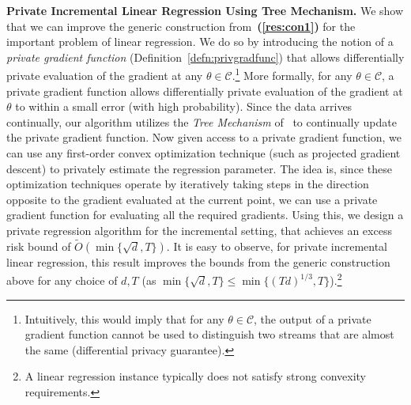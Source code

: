 \documentclass{article}
\theoremstyle{plain}
\newcommand{\resref}[1]{{\bf (\ref{res:#1})}}
\def \eps {\epsilon}
\def \CCC {\mathcal{C}}
\begin{document}
\begin{list}{{\bf ()}}{
\setlength{\leftmargin}{12pt}
\setlength{\listparindent}{\parindent}
\setlength{\parsep}{0pt}}

\item \label{res:con2} \textbf{Private Incremental Linear Regression Using Tree Mechanism.} 
We show that we can improve the generic construction from~\resref{con1} for the important problem of linear regression. We do so by introducing the notion of a {\em private gradient function} (Definition~\ref{defn:privgradfunc}) that allows differentially private evaluation of the gradient at any $\theta \in \CCC$.\!\footnote{Intuitively, this would imply that for any $\theta \in \CCC$, the output of a private gradient function cannot be used to distinguish two streams that are almost the same (differential privacy guarantee).} More formally, for any $\theta \in \CCC$, a private gradient function allows differentially private evaluation of the gradient at $\theta$ to within a small error (with high probability). Since the data arrives continually, our algorithm utilizes the \emph{Tree Mechanism} of~\cite{DNPR10,CSS11} to continually update the private gradient function. Now given access to a private gradient function, we can use any first-order convex optimization technique (such as projected gradient descent) to privately estimate the regression parameter. The idea is, since these optimization techniques operate by iteratively taking steps in the direction opposite to the gradient evaluated at the current point, we can use a private gradient function for evaluating all the required gradients. Using this, we design a private regression algorithm for the incremental setting, that achieves an excess risk bound of $\tilde{O}(\min\{\sqrt{d},T\})$. It is easy to observe, for private incremental linear regression, this result improves the bounds from the generic construction above for any choice of $d,T$ (as $\min\{\sqrt{d},T\} \leq \min\{(Td)^{1/3},T\}$).\!\footnote{A linear regression instance typically does not satisfy strong convexity requirements.} 


\end{list}
\end{document}

